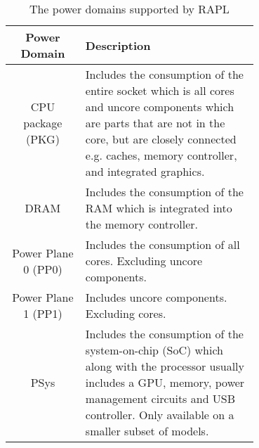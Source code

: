 \begin{table}[ht]
    \centering
    \begin{tabular}{|| c | p{0.7\linewidth}||}
    \hline
    \textbf{Power Domain}  & \textbf{Description}                            \\ [0.5ex] \hline\hline
    CPU package (PKG)        & Includes the consumption of the entire socket which is all cores and uncore components which are parts that are not in the core, but are closely connected e.g. caches, memory controller, and integrated graphics.       \\ \hline
    DRAM                & Includes the consumption of the RAM which is integrated into the memory controller.                       \\ \hline
    Power Plane 0 (PP0)                 & Includes the consumption of all cores. Excluding uncore components.               \\ \hline
    Power Plane 1 (PP1)      & Includes uncore components. Excluding cores.           \\ \hline
    PSys & Includes the consumption of the system-on-chip (SoC) which along with the processor usually includes a GPU, memory, power management circuits and USB controller. Only available on a smaller subset of models.       \\ \hline
    \end{tabular}
    \caption{The power domains supported by RAPL}
    \label{tab:RAPL_Domain}
    \end{table}